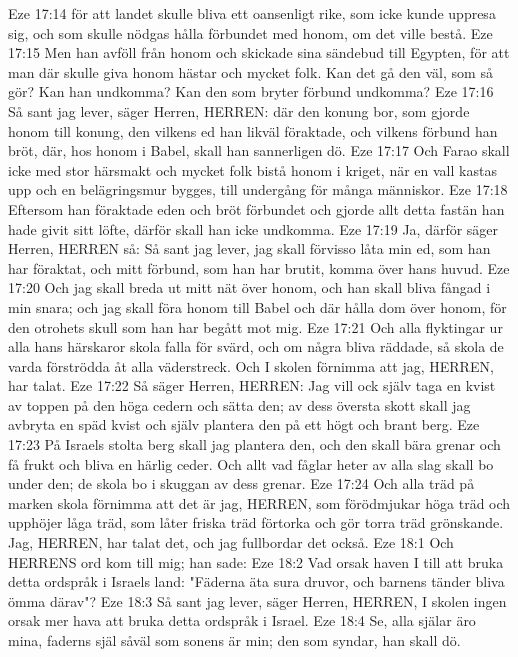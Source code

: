 Eze 17:14  för att landet skulle bliva ett oansenligt rike, som icke kunde uppresa sig, och som skulle nödgas hålla förbundet med honom, om det ville bestå.
Eze 17:15  Men han avföll från honom och skickade sina sändebud till Egypten, för att man där skulle giva honom hästar och mycket folk. Kan det gå den väl, som så gör? Kan han undkomma? Kan den som bryter förbund undkomma?
Eze 17:16  Så sant jag lever, säger Herren, HERREN: där den konung bor, som gjorde honom till konung, den vilkens ed han likväl föraktade, och vilkens förbund han bröt, där, hos honom i Babel, skall han sannerligen dö.
Eze 17:17  Och Farao skall icke med stor härsmakt och mycket folk bistå honom i kriget, när en vall kastas upp och en belägringsmur bygges, till undergång för många människor.
Eze 17:18  Eftersom han föraktade eden och bröt förbundet och gjorde allt detta fastän han hade givit sitt löfte, därför skall han icke undkomma.
Eze 17:19  Ja, därför säger Herren, HERREN så: Så sant jag lever, jag skall förvisso låta min ed, som han har föraktat, och mitt förbund, som han har brutit, komma över hans huvud.
Eze 17:20  Och jag skall breda ut mitt nät över honom, och han skall bliva fångad i min snara; och jag skall föra honom till Babel och där hålla dom över honom, för den otrohets skull som han har begått mot mig.
Eze 17:21  Och alla flyktingar ur alla hans härskaror skola falla för svärd, och om några bliva räddade, så skola de varda förströdda åt alla väderstreck. Och I skolen förnimma att jag, HERREN, har talat.
Eze 17:22  Så säger Herren, HERREN: Jag vill ock själv taga en kvist av toppen på den höga cedern och sätta den; av dess översta skott skall jag avbryta en späd kvist och själv plantera den på ett högt och brant berg.
Eze 17:23  På Israels stolta berg skall jag plantera den, och den skall bära grenar och få frukt och bliva en härlig ceder. Och allt vad fåglar heter av alla slag skall bo under den; de skola bo i skuggan av dess grenar.
Eze 17:24  Och alla träd på marken skola förnimma att det är jag, HERREN, som förödmjukar höga träd och upphöjer låga träd, som låter friska träd förtorka och gör torra träd grönskande. Jag, HERREN, har talat det, och jag fullbordar det också.
Eze 18:1  Och HERRENS ord kom till mig; han sade:
Eze 18:2  Vad orsak haven I till att bruka detta ordspråk i Israels land: "Fäderna äta sura druvor, och barnens tänder bliva ömma därav"?
Eze 18:3  Så sant jag lever, säger Herren, HERREN, I skolen ingen orsak mer hava att bruka detta ordspråk i Israel.
Eze 18:4  Se, alla själar äro mina, faderns själ såväl som sonens är min; den som syndar, han skall dö.
